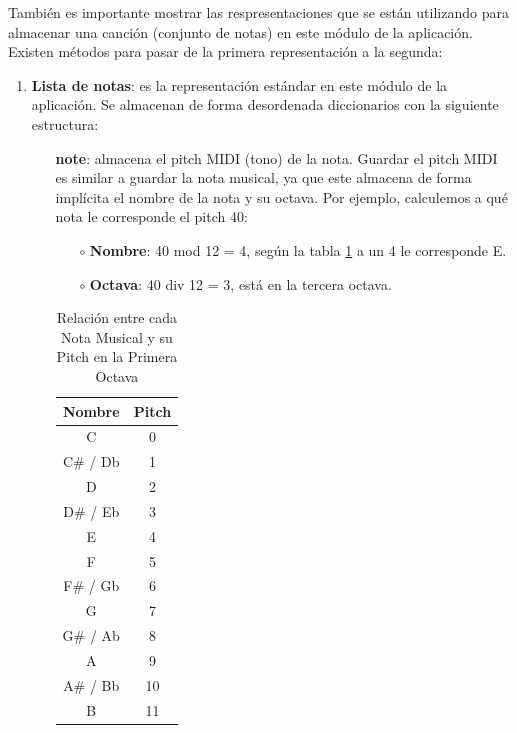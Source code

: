     También es importante mostrar las respresentaciones que se están utilizando para almacenar una canción (conjunto de notas) en este módulo de la aplicación. Existen métodos para pasar de la primera representación a la segunda:

    \begin{enumerate}
        \item \textbf{Lista de notas}: es la representación estándar en este módulo de la aplicación. Se almacenan de forma desordenada diccionarios con la siguiente estructura:
        \begin{enumerate}
            \item[\textbullet] \textbf{note}: almacena el pitch MIDI (tono) de la nota. Guardar el pitch MIDI es similar a guardar la nota musical, ya que este almacena de forma implícita el nombre de la nota y su octava. Por ejemplo, calculemos a qué nota le corresponde el pitch 40:
            \begin{enumerate}
                    \item[\(\circ\)] \textbf{Nombre}: 40 mod 12 = 4, según la tabla \ref{tab:nota_pitch} a un 4 le corresponde E.
                    \item[\(\circ\)] \textbf{Octava}: 40 div 12 = 3, está en la tercera octava.
            \end{enumerate}
                       
\begin{table}[htbp]
    \centering
    \begin{tabular}{c|c}
        \textbf{Nombre} & \textbf{Pitch} \\
        \hline
        C & 0 \\
        C\# / Db & 1 \\
        D & 2 \\
        D\# / Eb & 3 \\
        E & 4 \\
        F & 5 \\
        F\# / Gb & 6 \\
        G & 7 \\
        G\# / Ab & 8 \\
        A & 9 \\
        A\# / Bb & 10 \\
        B & 11 \\
    \end{tabular}
    \caption{Relación entre cada Nota Musical y su Pitch en la Primera Octava}
\label{tab:nota_pitch}
\end{table}


\end{enumerate}
\end{enumerate}
